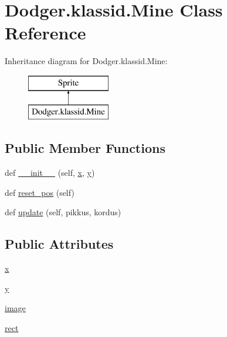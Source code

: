 \hypertarget{class_dodger_1_1klassid_1_1_mine}{}\section{Dodger.\+klassid.\+Mine Class Reference}
\label{class_dodger_1_1klassid_1_1_mine}
Inheritance diagram for Dodger.\+klassid.\+Mine\+:\begin{figure}[H]
\begin{center}
\leavevmode
\includegraphics[height=2.000000cm]{class_dodger_1_1klassid_1_1_mine}
\end{center}
\end{figure}
\subsection*{Public Member Functions}
\begin{DoxyCompactItemize}
\item 
def \hyperlink{class_dodger_1_1klassid_1_1_mine_a0dc99bc7580ee7a9bd155dec1b66df98}{\+\_\+\+\_\+init\+\_\+\+\_\+} (self, \hyperlink{class_dodger_1_1klassid_1_1_mine_accdd2e2ec2e81511337e183369d5916a}{x}, \hyperlink{class_dodger_1_1klassid_1_1_mine_a634b0ff493f5bba0350fc58d09eb040d}{y})
\item 
def \hyperlink{class_dodger_1_1klassid_1_1_mine_aec34add3ad847964539079cbb200e79a}{reset\+\_\+pos} (self)
\item 
def \hyperlink{class_dodger_1_1klassid_1_1_mine_a8854f857140ecccdd9251c86605aaf79}{update} (self, pikkus, kordus)
\end{DoxyCompactItemize}
\subsection*{Public Attributes}
\begin{DoxyCompactItemize}
\item 
\hyperlink{class_dodger_1_1klassid_1_1_mine_accdd2e2ec2e81511337e183369d5916a}{x}
\item 
\hyperlink{class_dodger_1_1klassid_1_1_mine_a634b0ff493f5bba0350fc58d09eb040d}{y}
\item 
\hyperlink{class_dodger_1_1klassid_1_1_mine_a95e8cfdeb751fc7180cec6eeb8bb337b}{image}
\item 
\hyperlink{class_dodger_1_1klassid_1_1_mine_a268ed423734c64d9b2b2bc36012d134f}{rect}
\end{DoxyCompactItemize}


